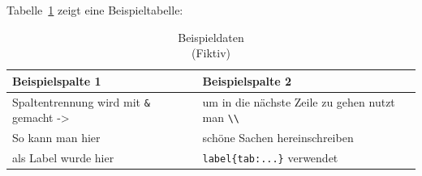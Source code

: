 Tabelle~\ref{tab:Beispieldaten} zeigt eine Beispieltabelle:
\begin{table}[htbp]
	\centering
	\renewcommand{\arraystretch}{1.3}
		\begin{tabular}{l|l}
			\textbf{Beispielspalte 1} & \textbf{Beispielspalte 2} \\
			\hline
			Spaltentrennung wird mit \verb|&| gemacht -> &
			um in die nächste Zeile zu gehen nutzt man \verb|\\| \\
			\hline
			So kann man hier &
			schöne Sachen hereinschreiben \\
			als Label wurde hier &
			\verb|label{tab:...}| verwendet
		\end{tabular}
		\caption[Beispieldaten]{%
			Beispieldaten\\
			{\fontsize{10}{12}\selectfont (Fiktiv)}%
		}
		\label{tab:Beispieldaten}
\end{table}
\clearpage
